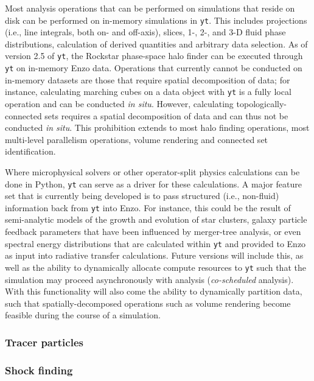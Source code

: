 Most analysis operations that can be performed on simulations that reside on
disk can be performed on in-memory simulations in \texttt{yt}.  This includes
projections (i.e., line integrals, both on- and off-axis), slices, 1-, 2-, and
3-D fluid phase distributions, calculation of derived quantities and arbitrary
data selection.  As of version 2.5 of \texttt{yt},  the Rockstar phase-space
halo finder \citep{2013ApJ...762..109B} can be executed through \texttt{yt} on
in-memory Enzo data.  Operations that currently cannot be conducted on
in-memory datasets are those that require spatial decomposition of data; for
instance, calculating marching cubes on a data object with \texttt{yt} is a
fully local operation and can be conducted \textit{in situ}.  However,
calculating topologically-connected sets requires a spatial decomposition of
data and can thus not be conducted \textit{in situ}.  This prohibition extends
to most halo finding operations, most multi-level parallelism operations,
volume rendering and connected set identification.

Where microphysical solvers or other operator-split physics calculations can be
done in Python, \texttt{yt} can serve as a driver for these calculations.  A
major feature set that is currently being developed is to pass structured
(i.e., non-fluid) information back from \texttt{yt} into Enzo.  For instance,
this could be the result of semi-analytic models of the growth and evolution of
star clusters, galaxy particle feedback parameters that have been influenced by
merger-tree analysis, or even spectral energy distributions that are calculated
within \texttt{yt} and provided to Enzo as input into radiative transfer
calculations.  Future versions will include this, as well as the ability to
dynamically allocate compute resources to \texttt{yt} such that the simulation
may proceed asynchronously with analysis (\textit{co-scheduled} analysis).
With this functionality will also come the ability to dynamically partition
data, such that spatially-decomposed operations such as volume rendering become
feasible during the course of a simulation.

\subsubsection{Tracer particles}

\subsubsection{Shock finding}

